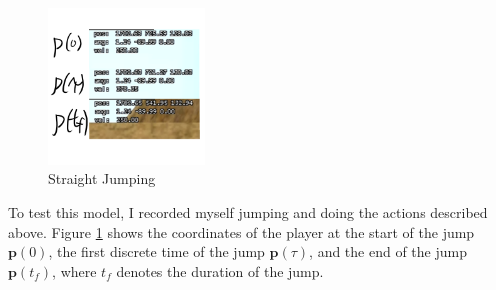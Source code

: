 \documentclass[a4paper,12pt]{article}
\newcommand{\tvec}[1]{\boldsymbol{#1}}
\newcommand{\tp}{\tvec{p}}
\begin{document}
\begin{figure}
    \includegraphics[width=0.37\textwidth,right]{assets/2straightjumping.png}
    \caption{Straight Jumping}
    \label{fig:2straightjumping}
\end{figure}

To test this model, I recorded myself jumping and doing the actions described above. Figure \ref{fig:2straightjumping} shows the coordinates of the player at the start of the jump $\tp(0)$, the first discrete time of the jump $\tp(\tau)$, and the end of the jump $\tp(t_f)$, where $t_f$ denotes the duration of the jump. %








%
\newpage
%
\newpage
%
\newpage
%

\nocite{*}
\newpage
\printbibliography
\end{document}
